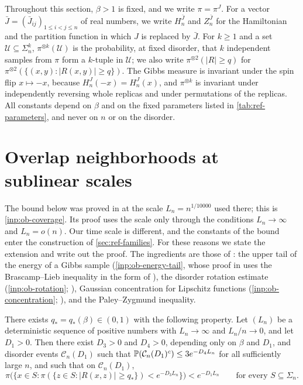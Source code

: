 Throughout this section, $\beta>1$ is fixed, and we write $\pi=\pi^J$. For
a vector $\bar J=(\bar J_{ij})_{1\le i<j\le n}$ of real numbers, we write
$H_n^{\bar J}$ and $Z_n^{\bar J}$ for the Hamiltonian and the partition
function in which $J$ is replaced by $\bar J$. For $k\ge1$ and a
set $\mathcal U\subseteq\Sigma_n^k$, $\pi^{\otimes k}(\mathcal U)$ is the
probability, at fixed disorder, that $k$ independent samples from $\pi$ form
a $k$-tuple in $\mathcal U$; we also write
$\pi^{\otimes2}(|R|\ge q)$ for
$\pi^{\otimes2}(\{(x,y):|R(x,y)|\ge q\})$. The Gibbs measure is invariant
under the spin flip $x\mapsto-x$, because $H_n^J(-x)=H_n^J(x)$, and $\pi^{\otimes k}$
is invariant under independently reversing whole replicas and under permutations of
the replicas. All constants depend on $\beta$ and on the fixed parameters
listed in \cref{tab:ref-parameters}, and never on $n$ or on the disorder.

\section{Overlap neighborhoods at sublinear scales}\label{sec:ref-neighborhoods}

The bound below was proved in \cite[Proposition~6.1]{oai-barriers} at the
scale $L_n=n^{1/10000}$ used there; this is \cref{inp:ob-coverage}. Its proof
uses the scale only through the conditions $L_n\to\infty$ and $L_n=o(n)$. Our
time scale is different, and the constants of the bound enter the
construction of \cref{sec:ref-families}. For these reasons we state the
extension and write out the proof. The ingredients are those of
\cite{oai-barriers}: the upper
tail of the energy of a Gibbs sample (\cref{inp:ob-energy-tail}, whose proof
in \cite[Lemma~5.1]{oai-barriers} uses the Brascamp--Lieb inequality
\cite{brascamp-lieb-1976} in the form of \cite[Lemma~2.1]{oai-barriers}), the
disorder rotation estimate (\cref{inp:ob-rotation};
\cite[Lemma~5.2]{oai-barriers}), Gaussian concentration
for Lipschitz functions (\cref{inp:ob-concentration};
\cite[Lemma~2.1]{oai-barriers}), and the
Paley--Zygmund inequality.

\begin{lemma}
\label{b:lem:coverage-extension}
There exists $q_*=q_*(\beta)\in(0,1)$ with the following property. Let
$(L_n)$ be a deterministic sequence of positive numbers with $L_n\to\infty$
and $L_n/n\to0$, and let $D_1>0$. Then there exist $D_3>0$ and $D_4>0$, depending only
on $\beta$ and $D_1$, and disorder events $\mathcal C_n(D_1)$ such that
$\mathbb P(\mathcal C_n(D_1)^c)\le3e^{-D_4L_n}$ for all sufficiently large $n$,
and such that on $\mathcal C_n(D_1)$,
\begin{equation}\label{b:eq:general-coverage}
 \pi\bigl(\bigl\{x\in S:
   \pi(\{z\in S:|R(x,z)|\ge q_*\})<e^{-D_3L_n}\bigr\}\bigr)
 <e^{-D_1L_n}
 \qquad\text{for every }S\subseteq\Sigma_n .
\end{equation}
\end{lemma}

